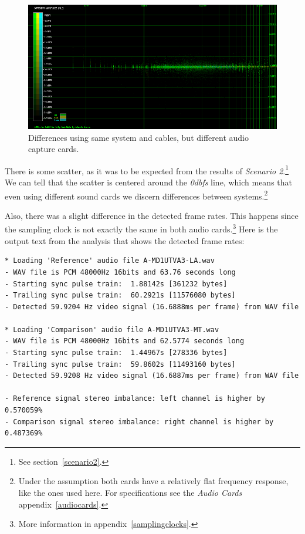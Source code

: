 \documentclass[10pt,a4paper]{report}
\newcommand{\db}[1]{\textit{\mbox{#1\acrshort{dbfs}}}}
\begin{document}
\begin{figure}[H]
	\centering
	\includegraphics[width=1.0\linewidth]{images/interpretation/Plot5-1-All.png}
	\caption[Different sound cards]{Differences using same system and cables, but different audio capture cards.}
	\label{fig:plot5-1-all}
\end{figure}

There is some scatter, as it was to be expected from the results of \textit{Scenario 2}.\footnote{See section~\ref{scenario2}.} We can tell that the scatter is centered around the \db{0} line, which means that even using different sound cards we discern differences between systems.\footnote{Under the assumption both cards have a relatively flat frequency response, like the ones used here. For specifications see the \textit{Audio Cards} appendix~\ref{audiocards}.}

Also, there was a slight difference in the detected frame rates. This happens since the sampling clock is not exactly the same in both audio cards.\footnote{More information in appendix~\ref{samplingclocks}.} Here is the output text from the analysis that shows the detected frame rates:

\begin{verbatim}
* Loading 'Reference' audio file A-MD1UTVA3-LA.wav
- WAV file is PCM 48000Hz 16bits and 63.76 seconds long
- Starting sync pulse train:  1.88142s [361232 bytes]
- Trailing sync pulse train:  60.2921s [11576080 bytes]
- Detected 59.9204 Hz video signal (16.6888ms per frame) from WAV file

* Loading 'Comparison' audio file A-MD1UTVA3-MT.wav
- WAV file is PCM 48000Hz 16bits and 62.5774 seconds long
- Starting sync pulse train:  1.44967s [278336 bytes]
- Trailing sync pulse train:  59.8602s [11493160 bytes]
- Detected 59.9208 Hz video signal (16.6887ms per frame) from WAV file

- Reference signal stereo imbalance: left channel is higher by 0.570059%
- Comparison signal stereo imbalance: right channel is higher by 0.487369%
\end{verbatim}
\end{document}
